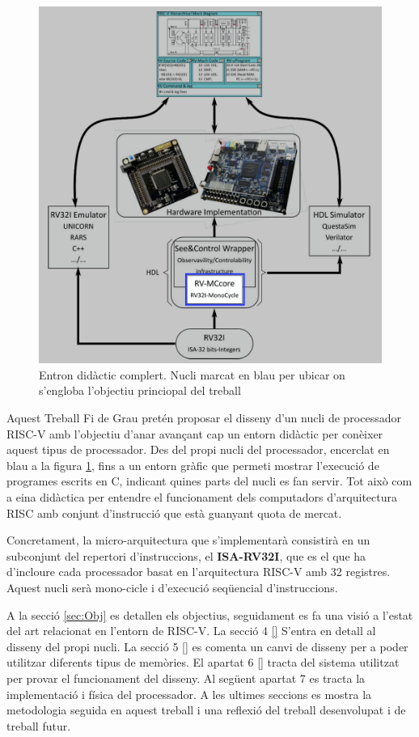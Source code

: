 \documentclass[10pt,a4paper,twocolumn,twoside]{article}
\begin{document}
    \begin{figure}[!ht]
    \centering
    	\includegraphics[width=\linewidth]{img/core_stack.png}
        \caption{Entron didàctic complert. Nucli marcat en blau per ubicar on s'engloba l'objectiu princiopal del treball}
        \label{fig:core_stack}
    \end{figure}

Aquest Treball Fi de Grau pretén proposar el disseny d'un nucli de processador RISC-V amb l’objectiu d’anar avançant cap un entorn didàctic per conèixer aquest tipus de processador. Des del propi nucli del processador, encerclat en blau a la figura \ref{fig:core_stack}, fins a un entorn gràfic que permeti mostrar l'execució de programes escrits en C, indicant quines parts del nucli es fan servir.
Tot això com a eina didàctica per entendre el funcionament dels computadors d'arquitectura RISC amb conjunt d'instrucció que està guanyant quota de mercat. 

Concretament, la micro-arquitectura que s'implementarà consistirà en un subconjunt del repertori d’instruccions, el \textbf{ISA-RV32I}, que es el que ha d'incloure cada processador basat en l'arquitectura RISC-V amb 32 registres. 
Aquest nucli serà mono-cicle i d’execució seqüencial d’instruccions. 

A la secció \ref{sec:Obj} es detallen els objectius, seguidament es fa una visió a l'estat del art relacionat en l'entorn de RISC-V. La secció 4 \ref{} S'entra en detall al disseny del propi nucli. La secció 5 \ref{} es comenta un canvi de disseny per a poder utilitzar diferents tipus de memòries. El apartat 6 \ref{} tracta del sistema utilitzat per provar el funcionament del disseny. Al següent apartat 7 es tracta la implementació i física del processador. A les ultimes seccions es mostra la metodologia seguida en aquest treball i una reflexió del treball desenvolupat i de treball futur.
\end{document}
